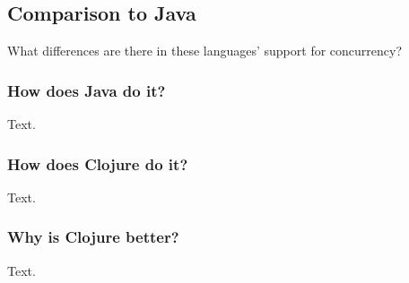 \subsection{Comparison to Java}

    What differences are there in these languages' support for concurrency?

\subsubsection{How does Java do it?}

    Text.

\subsubsection{How does Clojure do it?}

    Text.

\subsubsection{Why is Clojure better?}

    Text.
